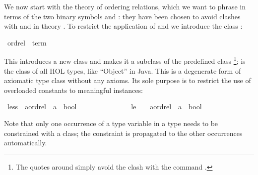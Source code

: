 %
\begin{isabellebody}%
\def\isabellecontext{Overloading{\isadigit{1}}}%
%
%
\begin{isamarkuptext}%
We now start with the theory of ordering relations, which we want to phrase
in terms of the two binary symbols \isa{{\isacharless}{\isacharless}} and \isa{{\isacharless}{\isacharless}{\isacharequal}}: they have
been chosen to avoid clashes with \isa{{\isacharless}} and \isa{{\isasymle}} in theory . To restrict the application of \isa{{\isacharless}{\isacharless}} and \isa{{\isacharless}{\isacharless}{\isacharequal}} we
introduce the class :%
\end{isamarkuptext}%
\ ordrel\ {\isacharless}\ {\isachardoublequote}term{\isachardoublequote}%
\begin{isamarkuptext}%
\noindent
This introduces a new class  and makes it a subclass of
the predefined class \footnote{The quotes around 
simply avoid the clash with the command .}; 
is the class of all HOL types, like ``Object'' in Java.
This is a degenerate form of axiomatic type class without any axioms.
Its sole purpose is to restrict the use of overloaded constants to meaningful
instances:%
\end{isamarkuptext}%
\ less\ {\isacharcolon}{\isacharcolon}\ {\isachardoublequote}{\isacharparenleft}{\isacharprime}a{\isacharcolon}{\isacharcolon}ordrel{\isacharparenright}\ {\isasymRightarrow}\ {\isacharprime}a\ {\isasymRightarrow}\ bool{\isachardoublequote}\ \ \ \ \ {\isacharparenleft}\ {\isachardoublequote}{\isacharless}{\isacharless}{\isachardoublequote}\ \ {}{}{\isacharparenright}\isanewline
\ \ \ \ \ \ \ le\ \ \ {\isacharcolon}{\isacharcolon}\ {\isachardoublequote}{\isacharparenleft}{\isacharprime}a{\isacharcolon}{\isacharcolon}ordrel{\isacharparenright}\ {\isasymRightarrow}\ {\isacharprime}a\ {\isasymRightarrow}\ bool{\isachardoublequote}\ \ \ \ \ {\isacharparenleft}\ {\isachardoublequote}{\isacharless}{\isacharless}{\isacharequal}{\isachardoublequote}\ {}{}{\isacharparenright}%
\begin{isamarkuptext}%
\noindent
Note that only one occurrence of a type variable in a type needs to be
constrained with a class; the constraint is propagated to the other
occurrences automatically.


\end{isamarkuptext}
\end{isabellebody}
